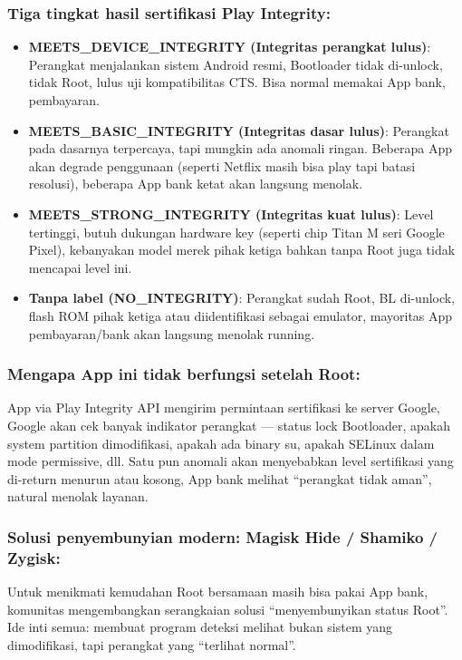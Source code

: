 \subsubsection*{Tiga tingkat hasil sertifikasi Play Integrity:}

\begin{itemize}
  \item \textbf{MEETS\_DEVICE\_INTEGRITY (Integritas perangkat lulus)}: Perangkat menjalankan sistem Android resmi, Bootloader tidak di-unlock, tidak Root, lulus uji kompatibilitas CTS. Bisa normal memakai App bank, pembayaran.
  \item \textbf{MEETS\_BASIC\_INTEGRITY (Integritas dasar lulus)}: Perangkat pada dasarnya terpercaya, tapi mungkin ada anomali ringan. Beberapa App akan degrade penggunaan (seperti Netflix masih bisa play tapi batasi resolusi), beberapa App bank ketat akan langsung menolak.
  \item \textbf{MEETS\_STRONG\_INTEGRITY (Integritas kuat lulus)}: Level tertinggi, butuh dukungan hardware key (seperti chip Titan M seri Google Pixel), kebanyakan model merek pihak ketiga bahkan tanpa Root juga tidak mencapai level ini.
  \item \textbf{Tanpa label (NO\_INTEGRITY)}: Perangkat sudah Root, BL di-unlock, flash ROM pihak ketiga atau diidentifikasi sebagai emulator, mayoritas App pembayaran/bank akan langsung menolak running.
\end{itemize}

\subsubsection*{Mengapa App ini tidak berfungsi setelah Root:}

App via Play Integrity API mengirim permintaan sertifikasi ke server Google, Google akan cek banyak indikator perangkat — status lock Bootloader, apakah system partition dimodifikasi, apakah ada binary su, apakah SELinux dalam mode permissive, dll. Satu pun anomali akan menyebabkan level sertifikasi yang di-return menurun atau kosong, App bank melihat “perangkat tidak aman”, natural menolak layanan.

\subsubsection*{Solusi penyembunyian modern: Magisk Hide / Shamiko / Zygisk:}

Untuk menikmati kemudahan Root bersamaan masih bisa pakai App bank, komunitas mengembangkan serangkaian solusi “menyembunyikan status Root”. Ide inti semua: membuat program deteksi melihat bukan sistem yang dimodifikasi, tapi perangkat yang “terlihat normal”.

